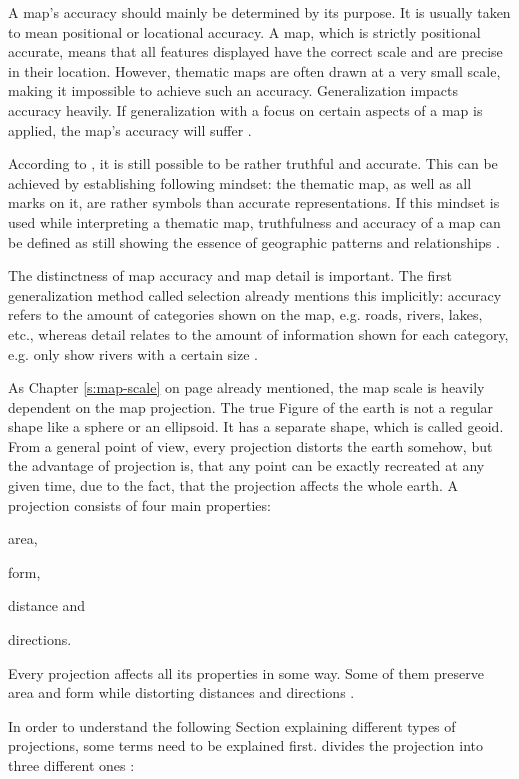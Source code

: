 A map's accuracy should mainly be determined by its purpose. It is usually taken to mean positional or locational accuracy. A map, which is strictly positional accurate, means that all features displayed have the correct scale and are precise in their location. However, thematic maps are often drawn at a very small scale, making it impossible to achieve such an accuracy. Generalization impacts accuracy heavily. If generalization with a focus on certain aspects of a map is applied, the map's accuracy will suffer .

According to \citeauthor{Tyner2010}, it is still possible to be rather truthful and accurate. This can be achieved by establishing following mindset: the thematic map, as well as all marks on it, are rather symbols than accurate representations. If this mindset is used while interpreting a thematic map, truthfulness and accuracy of a map can be defined as still showing the essence of geographic patterns and relationships .

The distinctness of map accuracy and map detail is important. The first generalization method called selection already mentions this implicitly: accuracy refers to the amount of categories shown on the map, e.g. roads, rivers, lakes, etc., whereas detail relates to the amount of information shown for each category, e.g. only show rivers with a certain size .

As Chapter \ref{s:map-scale} on page \pageref{s:map-scale} already mentioned, the map scale is heavily dependent on the map projection. The true Figure of the earth is not a regular shape like a sphere or an ellipsoid. It has a separate shape, which is called geoid.
From a general point of view, every projection distorts the earth somehow, but the advantage of projection is, that any point can be exactly recreated at any given time, due to the fact, that the projection affects the whole earth.
A projection consists of four main properties:
\begin{enumerate*}[label={(\arabic*)}]
\item area,
\item form,
\item distance and
\item directions.
\end{enumerate*}
Every projection affects all its properties in some way. Some of them preserve area and form while distorting distances and directions .

In order to understand the following Section explaining different types of projections, some terms need to be explained first. \citeauthor{Snyder1987} divides the projection into three different ones :

